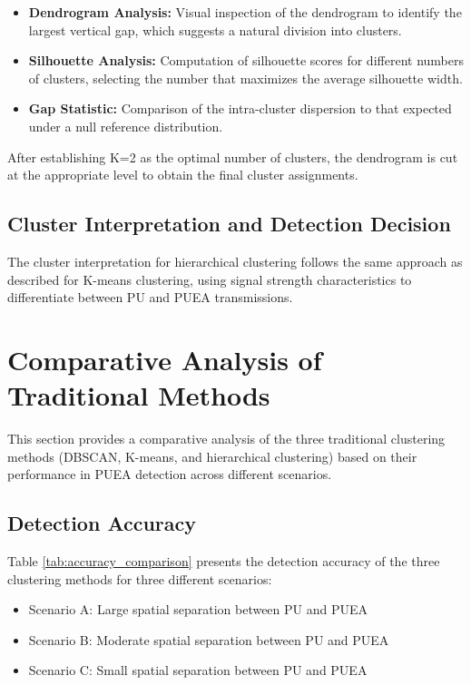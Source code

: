 \begin{itemize}
    \item \textbf{Dendrogram Analysis:} Visual inspection of the dendrogram to identify the largest vertical gap, which suggests a natural division into clusters.
    
    \item \textbf{Silhouette Analysis:} Computation of silhouette scores for different numbers of clusters, selecting the number that maximizes the average silhouette width.
    
    \item \textbf{Gap Statistic:} Comparison of the intra-cluster dispersion to that expected under a null reference distribution.
\end{itemize}

After establishing K=2 as the optimal number of clusters, the dendrogram is cut at the appropriate level to obtain the final cluster assignments.

\subsection{Cluster Interpretation and Detection Decision}

The cluster interpretation for hierarchical clustering follows the same approach as described for K-means clustering, using signal strength characteristics to differentiate between PU and PUEA transmissions.

\section{Comparative Analysis of Traditional Methods}

This section provides a comparative analysis of the three traditional clustering methods (DBSCAN, K-means, and hierarchical clustering) based on their performance in PUEA detection across different scenarios.

\subsection{Detection Accuracy}

Table \ref{tab:accuracy_comparison} presents the detection accuracy of the three clustering methods for three different scenarios:
\begin{itemize}
    \item Scenario A: Large spatial separation between PU and PUEA
    \item Scenario B: Moderate spatial separation between PU and PUEA
    \item Scenario C: Small spatial separation between PU and PUEA
\end{itemize}

